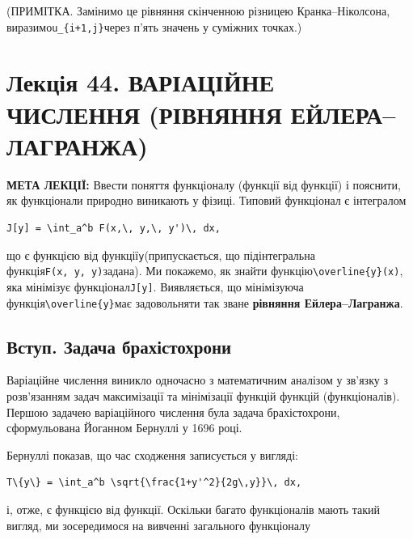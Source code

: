 \documentclass[
  ukrainian,
]{article}
\begin{document}
(ПРИМІТКА. Замінимо це рівняння скінченною різницею Кранка--Ніколсона,
виразимо\texttt{u\_\{i+1,j\}}через п'ять значень у суміжних точках.)

\section{Лекція 44. ВАРІАЦІЙНЕ ЧИСЛЕННЯ (РІВНЯННЯ
ЕЙЛЕРА--ЛАГРАНЖА)}\label{ux43bux435ux43aux446ux456ux44f-44.-ux432ux430ux440ux456ux430ux446ux456ux439ux43dux435-ux447ux438ux441ux43bux435ux43dux43dux44f-ux440ux456ux432ux43dux44fux43dux43dux44f-ux435ux439ux43bux435ux440ux430ux43bux430ux433ux440ux430ux43dux436ux430}

\textbf{МЕТА ЛЕКЦІЇ:} Ввести поняття функціоналу (функції від функції) і
пояснити, як функціонали природно виникають у фізиці. Типовий функціонал
є інтегралом

\begin{verbatim}
J[y] = \int_a^b F(x,\, y,\, y')\, dx,
\end{verbatim}

що є функцією від функції\texttt{y}(припускається, що підінтегральна
функція\texttt{F(x,\ y,\ y\textquotesingle{})}задана). Ми покажемо, як
знайти функцію\texttt{\textbackslash{}overline\{y\}(x)}, яка мінімізує
функціонал\texttt{J{[}y{]}}. Виявляється, що мінімізуюча
функція\texttt{\textbackslash{}overline\{y\}}має задовольняти так зване
\textbf{рівняння Ейлера--Лагранжа}.

\subsection{Вступ. Задача
брахістохрони}\label{ux432ux441ux442ux443ux43f.-ux437ux430ux434ux430ux447ux430-ux431ux440ux430ux445ux456ux441ux442ux43eux445ux440ux43eux43dux438}

Варіаційне числення виникло одночасно з математичним аналізом у зв'язку
з розв'язанням задач максимізації та мінімізації функцій функцій
(функціоналів). Першою задачею варіаційного числення була задача
брахістохрони, сформульована Йоганном Бернуллі у 1696 році.

Бернуллі показав, що час сходження записується у вигляді:

\begin{verbatim}
T\{y\} = \int_a^b \sqrt{\frac{1+y'^2}{2g\,y}}\, dx,
\end{verbatim}

і, отже, є функцією від функції. Оскільки багато функціоналів мають
такий вигляд, ми зосередимося на вивченні загального функціоналу
\end{document}
